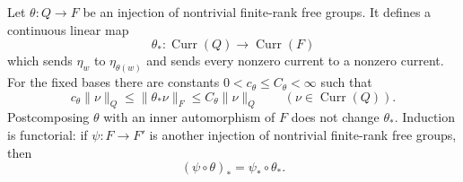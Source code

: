 \begin{lemma}
\label{ann:current-induction}
Let $\theta\colon Q\to F$ be an injection of nontrivial finite-rank
free groups.  It defines a continuous linear map
\[
 \theta_*\colon\operatorname{Curr}(Q)\longrightarrow
                    \operatorname{Curr}(F)
\]
which sends $\eta_w$ to $\eta_{\theta(w)}$ and sends every nonzero
current to a nonzero current.  For the fixed bases there are constants
$0<c_\theta\leq C_\theta<\infty$ such that
\begin{equation}
 c_\theta\|\nu\|_Q\leq\|\theta_*\nu\|_F
                     \leq C_\theta\|\nu\|_Q
 \qquad(\nu\in\operatorname{Curr}(Q)).
 \label{ann:induction-norm}
\end{equation}
Postcomposing $\theta$ with an inner automorphism of $F$ does not
change $\theta_*$.  Induction is functorial: if $\psi\colon F\to F'$
is another injection of nontrivial finite-rank free groups, then
\[
 (\psi\circ\theta)_*=\psi_*\circ\theta_*.
\]
\end{lemma}

